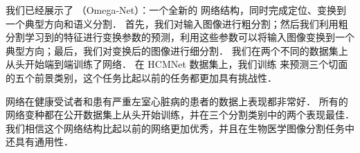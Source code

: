 
我们已经展示了 \omeganet{}（Omega-Net）：一个全新的 \CNN{} 网络结构，同时完成定位、变换到一个典型方向和语义分割．
首先，我们对输入图像进行粗分割；然后我们利用粗分割学习到的特征进行变换参数的预测，利用这些参数可以将输入图像变换到一个典型方向；最后，我们对变换后的图像进行细分割．
我们在两个不同的数据集上从头开始端到端训练了网络．
在 HCMNet 数据集上，我们训练 \omeganet{} 来预测三个切面的五个前景类别，这个任务比起以前的任务都更加具有挑战性．

网络在健康受试者和患有严重左室心脏病的患者的数据上表现都非常好．
所有的 \omeganet{} 网络变种都在公开数据集上从头开始训练，并在三个分割类别中的两个表现最佳．
我们相信这个网络结构比起以前的网络更加优秀，并且在生物医学图像分割任务中还具有通用性．



